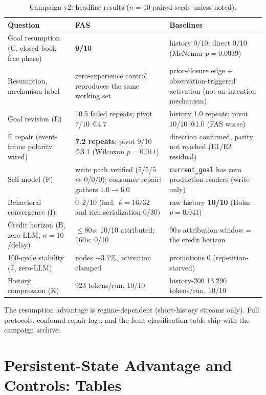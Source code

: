 \documentclass[10pt,a4paper]{article}
\begin{document}
\begin{table}[h]
\centering\small
\caption{Campaign v2: headline results ($n{=}10$ paired seeds unless noted).}
\label{tab:s-campaign}
\begin{tabular}{L{4.6cm}L{4.6cm}L{5.6cm}}
\toprule
\textbf{Question} & \textbf{FAS} & \textbf{Baselines} \\
\midrule
Goal resumption (C, closed-book free phase) & \textbf{9/10} & history 0/10; direct 0/10 (McNemar $p{=}0.0039$) \\
Resumption, mechanism label & zero-experience control reproduces the same working set & prior-closure edge + observation-triggered activation (not an intention mechanism) \\
Goal revision (E) & 10.5 failed repeats; pivot 7/10 @4.7 & history 1.0 repeats; pivot 10/10 @1.0 (FAS worse) \\
E repair (event-frame polarity wired) & \textbf{7.2 repeats}; pivot 9/10 @3.1 (Wilcoxon $p{=}0.011$) & direction confirmed, parity not reached (E1/E3 residual) \\
Self-model (F) & write path verified (5/5/5 vs 0/0/0); consumer repair: gathers 1.0$\rightarrow$6.0 & \texttt{current\_goal} has zero production readers (write-only) \\
Behavioral convergence (I) & 0--2/10 (incl.\ $k{=}16/32$ and rich serialization 0/30) & raw history \textbf{10/10} (Holm $p{=}0.041$) \\
Credit horizon (B, zero-LLM, $n{=}10$/delay) & $\le$80\,s: 10/10 attributed; 160\,s: 0/10 & 90\,s attribution window = the credit horizon \\
100-cycle stability (J, zero-LLM) & nodes $+3.7\%$, activation clamped & promotions 0 (repetition-starved) \\
History compression (K) & 923 tokens/run, 10/10 & history-200 13{,}290 tokens/run, 10/10 \\
\bottomrule
\end{tabular}
\end{table}

The resumption advantage is regime-dependent (short-history streams
only). Full protocols, confound repair logs, and the fault
classification table ship with the campaign archive.


\section{Persistent-State Advantage and Controls: Tables}
\label{s16:psa}
\end{document}
